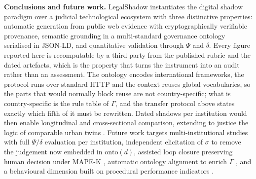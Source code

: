 \documentclass[engproc,proceedingpaper,submit,moreauthors]{Definitions/mdpi}
\begin{document}
\textbf{Conclusions and future work.} LegalShadow instantiates the digital shadow paradigm over a judicial technological ecosystem with three distinctive properties: automatic generation from public web evidence with cryptographically verifiable provenance, semantic grounding in a multi-standard governance ontology serialised in JSON-LD, and quantitative validation through $\Psi$ and $\delta$. Every figure reported here is recomputable by a third party from the published rubric and the dated artefacts, which is the property that turns the instrument into an audit rather than an assessment. The ontology encodes international frameworks, the protocol runs over standard HTTP and the context reuses global vocabularies, so the parts that would normally block reuse are not country-specific; what is country-specific is the rule table of $\Gamma$, and the transfer protocol above states exactly which fifth of it must be rewritten. Dated shadows per institution would then enable longitudinal and cross-sectional comparison, extending to justice the logic of comparable urban twins \cite{Shahat2021,Haraguchi2024}. Future work targets multi-institutional studies with full $\Psi/\delta$ evaluation per institution, independent elicitation of $\sigma$ to remove the judgement now embedded in $\mathrm{onto}(d)$, assisted loop closure preserving human decision under MAPE-K \cite{Kephart2003}, automatic ontology alignment to enrich $\Gamma$ \cite{Hogan2021}, and a behavioural dimension built on procedural performance indicators \cite{Medvedeva2020}.

\end{document}
